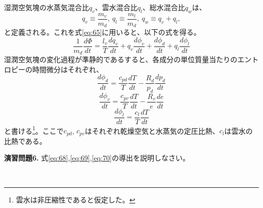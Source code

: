 \documentclass{ltjsarticle}
\begin{document}
湿潤空気塊の水蒸気混合比$q_{v}$、雲水混合比$q_{l}$、総水混合比$q_{w}$は、
\begin{equation}\label{eq:66}
 q_{v} \equiv \frac{m_{v}}{m_{d}}, \  q_{l} \equiv \frac{m_{l}}{m_{d}}, \  q_{w}\equiv q_{v}+ q_{l},
\end{equation}
と定義される。これを式\eqref{eq:65}に用いると、以下の式を得る。
\begin{equation}\label{eq:67}
 \frac{1}{m_{d}}\frac{d\Phi}{dt} = \frac{l_{v}}{T}\frac{dq_{v}}{dt}+q_{v}\frac{d\phi_{v}}{dt}+\frac{d\phi_{d}}{dt}+q_{l}\frac{d\phi_{l}}{dt}
\end{equation}
湿潤空気塊の変化過程が準静的であるすると、各成分の単位質量当たりのエントロピーの時間微分はそれぞれ、
\begin{equation}\label{eq:68}
\frac{d\phi_{d}}{dt}=\frac{c_{pd}}{T}\frac{dT}{dt}-\frac{R_{d}}{p_{d}}\frac{dp_{d}}{dt}
\end{equation}
\begin{equation}\label{eq:69}
\frac{d\phi_{v}}{dt}=\frac{c_{pv}}{T}\frac{dT}{dt}-\frac{R_{v}}{e}\frac{de}{dt}
\end{equation}
\begin{equation}\label{eq:70}
\frac{d\phi_{l}}{dt}=\frac{c_{l}}{T}\frac{dT}{dt}
\end{equation}
と書ける\footnote{雲水は非圧縮性であると仮定した。}。ここで$c_{pd}$, $c_{pv}$はそれぞれ乾燥空気と水蒸気の定圧比熱、$c_{l}$は雲水の比熱である。
\\

\begin{itembox}[l]{\bf{演習問題6.}}
式\eqref{eq:68},\eqref{eq:69},\eqref{eq:70}の導出を説明しなさい。
\end{itembox}
\\
\end{document}
